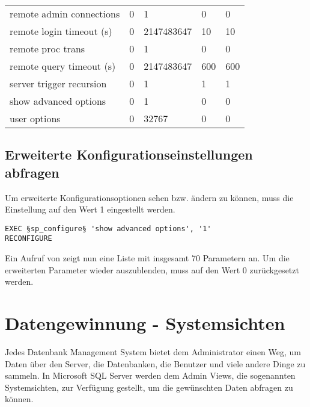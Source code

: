 \begin{center}
\begin{scriptsize}
\begin{mssql}
\begin{supertabular}{lllll}
remote admin connections          & 0  & 1          & 0     & 0 \\ 
remote login timeout (s)          & 0  & 2147483647 & 10    & 10 \\ 
remote proc trans                 & 0  & 1          & 0     & 0 \\
remote query timeout (s)          & 0  & 2147483647 & 600   & 600 \\
server trigger recursion          & 0  & 1          & 1     & 1 \\
show advanced options             & 0  & 1          & 0     & 0 \\
user options                      & 0  & 32767      & 0     & 0 \\
                \end{supertabular}
            \end{mssql}
          \end{scriptsize}
        \end{center}
      \subsection{Erweiterte Konfigurationseinstellungen abfragen}
        Um erweiterte Konfigurationsoptionen sehen bzw. ändern zu können, muss
        die Einstellung  auf den Wert 1
        eingestellt werden.
        \begin{lstlisting}[language=ms_sql,caption={Einblenden
          der erweiterten Konfigurationsoptionen},label=admin03_06]
EXEC §sp_configure§ 'show advanced options', '1'
RECONFIGURE
          \end{lstlisting}
        Ein Aufruf von  zeigt nun eine Liste mit
        insgesamt 70 Parametern an. Um die erweiterten Parameter wieder
        auszublenden, muss  auf den Wert
        0 zurückgesetzt werden.
        \begin{literaturinternet}
          \item \cite{ms176069}
          \item \cite{ms188787}
        \end{literaturinternet}
    \section{Datengewinnung - Systemsichten}
      Jedes Datenbank Management System bietet dem Administrator einen Weg, um
      Daten über den Server, die Datenbanken, die Benutzer und viele andere
      Dinge zu sammeln. In Microsoft SQL Server werden dem Admin Views, die
      sogenannten Systemsichten, zur Verfügung gestellt, um die gewünschten
      Daten abfragen zu können.
